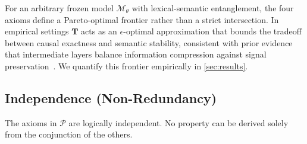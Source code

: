 \begin{remark}
For an arbitrary frozen model $\mathcal{M}_\theta$ with lexical-semantic entanglement, the four axioms define a Pareto-optimal frontier rather than a strict intersection. In empirical settings $\mathbf{T}$ acts as an $\epsilon$-optimal approximation that bounds the tradeoff between causal exactness and semantic stability, consistent with prior evidence that intermediate layers balance information compression against signal preservation~\citep{skean2025layerlayeruncoveringhidden,shani2025tokensthoughtsllmshumans}. We quantify this frontier empirically in \cref{sec:results}.
\end{remark}

\subsection{Independence (Non-Redundancy)}
\label{app:independence}

\begin{proposition}
The axioms in $\mathcal{P}$ are logically independent. No property can be derived solely from the conjunction of the others.
\end{proposition}

